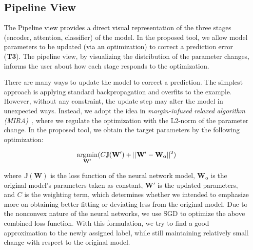 \subsection{Pipeline View}
\label{sec:pipeline}
The Pipeline view provides a direct visual representation of the three stages (encoder, attention, classifier) of the model. In the proposed tool, we allow model parameters to be updated (via an optimization) to correct a prediction error (\textbf{T3}). The pipeline view, by visualizing the distribution of the parameter changes, informs the user about how each stage responds to the optimization.

There are many ways to update the model to correct a prediction. The simplest approach is applying standard backpropagation and overfits to the example. However, without any constraint, the update step may alter the model in unexpected ways.
Instead, we adopt the idea in \emph{margin-infused relaxed algorithm (MIRA)}~\cite{CrammerSinger2003}, where we regulate the optimization with the L2-norm of the parameter change. In the proposed tool, we obtain the target parameters by the following optimization:

\begin{equation}
\vspace{-1mm}
\underset{\mathbf{W}'}{\mathrm{argmin}}( C \mathbb{J}(\mathbf{W}') + ||\mathbf{W}' - \mathbf{W_o}||^2)
\end{equation}

where $\mathbb{J}(\mathbf{W})$ is the loss function of the neural network model, $\mathbf{W_o}$ is the original model's parameters taken as constant, $\mathbf{W}'$ is the updated parameters, and $C$ is the weighting term, which determines whether we intended to emphasize more on obtaining better fitting or deviating less from the original model. Due to the nonconvex nature of the neural networks, we use SGD to optimize the above combined loss function.
%
With this formulation, we try to find a good approximation to the newly assigned label, while still maintaining relatively small change with respect to the original model.

